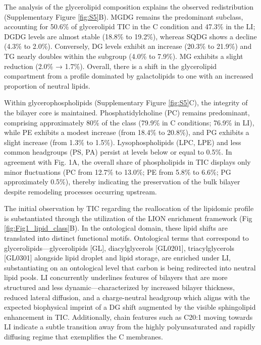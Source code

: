 \documentclass[10pt,letterpaper]{article}
\begin{document}
The analysis of the glycerolipid composition explains the observed redistribution (Supplementary Figure \ref{fig:S5}B). MGDG remains the predominant subclass, accounting for 50.6\% of glycerolipid TIC in the C condition and 47.3\% in the LI; DGDG levels are almost stable (18.8\% to 19.2\%), whereas SQDG shows a decline (4.3\% to 2.0\%). Conversely, DG levels exhibit an increase (20.3\% to 21.9\%) and TG nearly doubles within the subgroup (4.0\% to 7.9\%). MG exhibits a slight reduction (2.0\% → 1.7\%). Overall, there is a shift in the glycerolipid compartment from a profile dominated by galactolipids to one with an increased proportion of neutral lipids.

Within glycerophospholipids (Supplementary Figure \ref{fig:S5}C), the integrity of the bilayer core is maintained. Phosphatidylcholine (PC) remains predominant, comprising approximately 80\% of the class (79.9\% in C conditions; 76.9\% in LI), while PE exhibits a modest increase (from 18.4\% to 20.8\%), and PG exhibits a slight increase (from 1.3\% to 1.5\%). Lysophospholipids (LPC, LPE) and less common headgroups (PS, PA) persist at levels below or equal to 0.5\%. In agreement with Fig. 1A, the overall share of phospholipids in TIC displays only minor fluctuations (PC from 12.7\% to 13.0\%; PE from 5.8\% to 6.6\%; PG approximately 0.5\%), thereby indicating the preservation of the bulk bilayer despite remodeling processes occurring upstream.

The initial observation by TIC regarding the reallocation of the lipidomic profile is substantiated through the utilization of the LION enrichment framework (Fig \ref{fig:Fig1_lipid_class}B). In the ontological domain, these lipid shifts are translated into distinct functional motifs. Ontological terms that correspond to glycerolipids—glycerolipids [GL], diacylglycerols [GL0201], triacylglycerols [GL0301] alongside lipid droplet and lipid storage, are enriched under LI, substantiating on an ontological level that carbon is being redirected into neutral lipid pools. LI concurrently underlines features of bilayers that are more structured and less dynamic—characterized by increased bilayer thickness, reduced lateral diffusion, and a charge-neutral headgroup which aligns with the expected biophysical imprint of a DG shift augmented by the visible sphingolipid enhancement in TIC. Additionally, chain features such as C20:1 moving towards LI indicate a subtle transition away from the highly polyunsaturated and rapidly diffusing regime that exemplifies the C membranes.
\end{document}
